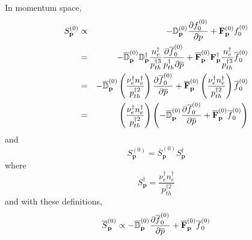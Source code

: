 In momentum space, 
\begin{eqnarray}
S_{\mathbf{p}}^{\left( 0\right) } &\propto &-\mathbb{D}_{\mathbf{p}}^{\left(
0\right) }\frac{\partial f_{0}^{\left( 0\right) }}{\partial p}+\mathbf{F}_{%
\mathbf{p}}^{\left( 0\right) }f_{0}^{\left( 0\right) }  \notag \\
&=&-\overline{\mathbb{D}}_{\mathbf{p}}^{\left( 0\right) }\mathbb{D}_{\mathbf{%
p}}^{\dag }\frac{n_{e}^{\dag }}{p_{th}^{\dag 3}}\frac{\partial \overline{f}%
_{0}^{\left( 0\right) }}{p_{th}^{\dag }\partial \overline{p}}+\overline{%
\mathbf{F}}_{\mathbf{p}}^{\left( 0\right) }\mathbf{F}_{\mathbf{p}}^{\dag }%
\frac{n_{e}^{\dag }}{p_{th}^{\dag 3}}\overline{f}_{0}^{\left( 0\right) } 
\notag \\
&=&-\overline{\mathbb{D}}_{\mathbf{p}}^{\left( 0\right) }\left( \frac{\nu
_{e}^{\dag }n_{e}^{\dag }}{p_{th}^{\dag 2}}\right) \frac{\partial \overline{f%
}_{0}^{\left( 0\right) }}{\partial \overline{p}}+\overline{\mathbf{F}}_{%
\mathbf{p}}^{\left( 0\right) }\left( \frac{\nu _{e}^{\dag }n_{e}^{\dag }}{
p_{th}^{\dag 2}}\right) \overline{f}_{0}^{\left( 0\right) }  \notag \\
&=&\left( \frac{\nu _{e}^{\dag }n_{e}^{\dag }}{p_{th}^{\dag 2}}\right)
\left( -\overline{\mathbb{D}}_{\mathbf{p}}^{\left( 0\right) }\frac{\partial 
\overline{f}_{0}^{\left( 0\right) }}{\partial \overline{p}}+\overline{%
\mathbf{F}}_{\mathbf{p}}^{\left( 0\right) }\overline{f}_{0}^{\left( 0\right)
}\right)
\end{eqnarray}
and 
\begin{equation}
S_{\mathbf{p}}^{\left( 0\right) }=\overline{S}_{\mathbf{p}}^{\left( 0\right)
}S_{\mathbf{p}}^{\dag }
\end{equation}
where 
\begin{equation}
S_{\mathbf{p}}^{\dag }=\frac{\nu _{e}^{\dag }n_{e}^{\dag }}{p_{th}^{\dag 2}}
\end{equation}
and with these definitions, 
\begin{equation*}
\overline{S}_{\mathbf{p}}^{\left( 0\right) }\propto -\overline{\mathbb{D}}_{%
\mathbf{p}}^{\left( 0\right) }\frac{\partial \overline{f}_{0}^{\left(
0\right) }}{\partial \overline{p}}+\overline{\mathbf{F}}_{\mathbf{p}%
}^{\left( 0\right) }\overline{f}_{0}^{\left( 0\right) } 
\end{equation*}

